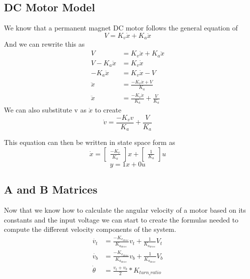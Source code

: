 \documentclass{scrartcl}
\begin{document}
\subsection{DC Motor Model}
We know that a permanent magnet DC motor follows the general equation of
\begin{equation}
    V = K_v\dot{x} + K_a\ddot{x}
\end{equation}
And we can rewrite this as
\begin{align*}
    V               & = K_v\dot{x} + K_a\ddot{x}                \\
    V - K_a\ddot{x} & = K_v\dot{x}                              \\
    -K_a\ddot{x}    & = K_v\dot{x} - V                          \\
    \ddot{x}        & = \frac{-K_v\dot{x} + V}{K_a}             \\
    \ddot{x}        & = \frac{-K_v\dot{x}}{K_a} + \frac{V}{K_a}
\end{align*}
We can also substitute v as \(\dot{x}\) to create
\begin{equation}
    \dot{v} = \frac{-K_v v}{K_a} + \frac{V}{K_a}
\end{equation}

This equation can then be written in state space form as
\begin{equation}
    \dot{x} = \begin{bmatrix}\frac{-K_v}{K_a}\end{bmatrix}x + \begin{bmatrix}\frac{1}{K_a}\end{bmatrix}u
\end{equation}
\begin{equation}
    y = 1x + 0u
\end{equation}

\subsection{A and B Matrices}
Now that we know how to calculate the angular velocity of a motor based on its constants and the input voltage we can start to create the formulas needed to compute the different velocity components of the system.
\begin{align}
    \dot{v_t}    & = \frac{-K_{v_\mathit{drive}}}{K_{a_\mathit{drive}}}v_t + \frac{1}{K_{a_\mathit{drive}}}V_t \\
    \dot{v_b}    & = \frac{-K_{v_\mathit{drive}}}{K_{a_\mathit{drive}}}v_b + \frac{1}{K_{a_\mathit{drive}}}V_b \\
    \dot{\theta} & = \frac{v_t + v_b}{2} * K_\mathit{turn\_ratio}
\end{align}
\end{document}
